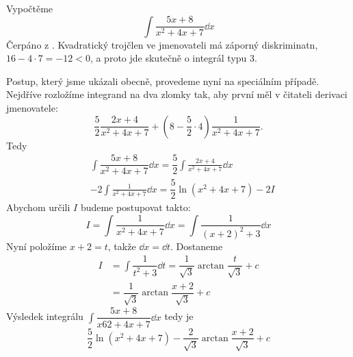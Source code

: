 \begin{mdframed}[style=mdexam]
  \begin{example}\label{mai:exam140}
    Vypočtěme 
    \begin{equation*}
      \int\dfrac{5x+8}{x^2+4x+7}\dd{x}
    \end{equation*}
    Čerpáno z \cite[s.~73]{Knichal}.  Kvadratický trojčlen ve jmenovateli má záporný diskriminatn,
    \(16-4\cdot7 = -12<0\), a proto jde skutečně o integrál typu 3.
    
    Postup, který jsme ukázali obecně, provedeme nyní na speciálním případě. Nejdříve rozložíme
    integrand na dva zlomky tak, aby první měl v čitateli derivaci jmenovatele: 
    \begin{equation*}
      \frac{5}{2}\frac{2x+4}{x^2+4x+7} + \left(8-\frac{5}{2}\cdot4\right)\frac{1}{x^2+4x+7}.
    \end{equation*}
    Tedy
    \begin{align*}
      & \int\dfrac{5x+8}{x^2+4x+7}\dd{x}  = \dfrac{5}{2}\int\frac{2x+4}{x^2+4x+7}\dd{x}  \\
      &-2\int\frac{1}{x^2+4x+7}\dd{x}     = \dfrac{5}{2}\ln(x^2+4x+7) - 2I
    \end{align*}
    Abychom určili \(I\) budeme postupovat takto:
    \begin{equation*}
      I = \int\dfrac{1}{x^2+4x+7}\dd{x} = \int\dfrac{1}{(x+2)^2+3}\dd{x} 
    \end{equation*}
    Nyní položíme \(x+2=t\), takže \(\dd{x}= \dd{t}\). Dostaneme
    \begin{align*}
      I &= \int\dfrac{1}{t^2+3}\dd{t} = \dfrac{1}{\sqrt{3}}\arctan\dfrac{t}{\sqrt{3}} + c \\
        &= \dfrac{1}{\sqrt{3}}\arctan\dfrac{x+2}{\sqrt{3}} + c
    \end{align*}
    Výsledek integrálu \(\int\dfrac{5x+8}{x62+4x+7}\dd{x}\) tedy je 
    \begin{equation*}
      \dfrac{5}{2}\ln(x^2+4x+7) - \dfrac{2}{\sqrt{3}}\arctan\dfrac{x+2}{\sqrt{3}} + c
    \end{equation*}
  \end{example}
\end{mdframed}